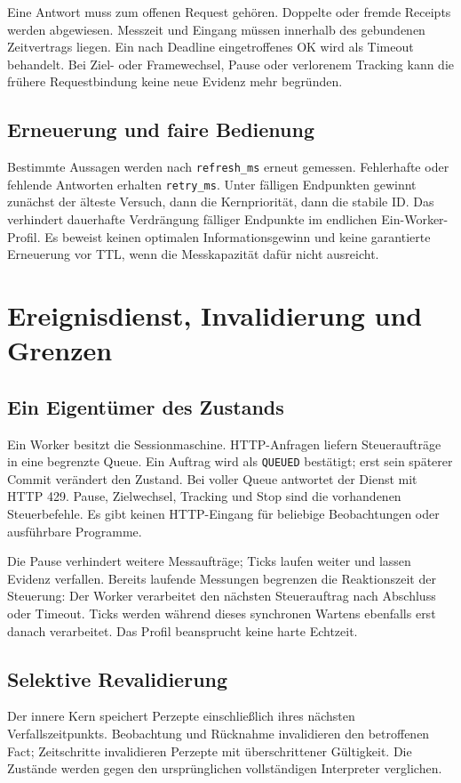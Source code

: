 \documentclass[11pt,a4paper]{article}
\newcommand{\nextsection}[2]{\clearpage{\color{accent}\small\textsf{#1}}\section{#2}}
\begin{document}
Eine Antwort muss zum offenen Request gehören. Doppelte oder
fremde Receipts werden abgewiesen. Messzeit und Eingang müssen
innerhalb des gebundenen Zeitvertrags liegen. Ein nach Deadline
eingetroffenes OK wird als Timeout behandelt. Bei Ziel- oder
Framewechsel, Pause oder verlorenem Tracking kann die frühere
Requestbindung keine neue Evidenz mehr begründen.

\subsection{Erneuerung und faire Bedienung}
Bestimmte Aussagen werden nach \texttt{refresh\_ms} erneut
gemessen. Fehlerhafte oder fehlende Antworten erhalten
\texttt{retry\_ms}. Unter fälligen Endpunkten gewinnt zunächst
der älteste Versuch, dann die Kernpriorität, dann die stabile ID.
Das verhindert dauerhafte Verdrängung fälliger Endpunkte im
endlichen Ein-Worker-Profil. Es beweist keinen optimalen
Informationsgewinn und keine garantierte Erneuerung vor TTL,
wenn die Messkapazität dafür nicht ausreicht.

\nextsection{16 / BETRIEBSVERTRAG}{Ereignisdienst, Invalidierung und Grenzen}
\subsection{Ein Eigentümer des Zustands}
Ein Worker besitzt die Sessionmaschine. HTTP-Anfragen liefern
Steueraufträge in eine begrenzte Queue. Ein Auftrag wird als
\texttt{QUEUED} bestätigt; erst sein späterer Commit verändert
den Zustand. Bei voller Queue antwortet der Dienst mit HTTP 429.
Pause, Zielwechsel, Tracking und Stop sind die vorhandenen
Steuerbefehle. Es gibt keinen HTTP-Eingang für beliebige
Beobachtungen oder ausführbare Programme.

Die Pause verhindert weitere Messaufträge; Ticks laufen weiter
und lassen Evidenz verfallen. Bereits laufende Messungen
begrenzen die Reaktionszeit der Steuerung: Der Worker verarbeitet
den nächsten Steuerauftrag nach Abschluss oder Timeout.
Ticks werden während dieses synchronen Wartens ebenfalls erst
danach verarbeitet. Das Profil beansprucht keine harte Echtzeit.

\subsection{Selektive Revalidierung}
Der innere Kern speichert Perzepte einschließlich ihres nächsten
Verfallszeitpunkts. Beobachtung und Rücknahme invalidieren den
betroffenen Fact; Zeitschritte invalidieren Perzepte mit
überschrittener Gültigkeit. Die Zustände werden gegen den
ursprünglichen vollständigen Interpreter verglichen.
\end{document}
